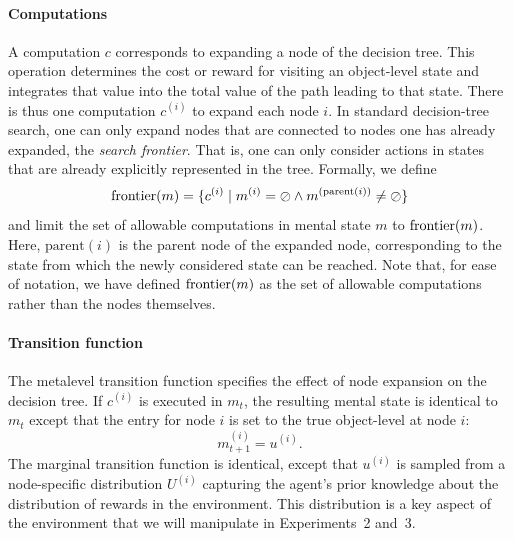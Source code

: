 \paragraph{Computations}

A computation $c$ corresponds to expanding a node of the decision tree. This operation determines the cost or reward for visiting an object-level state and integrates that value into the total value of the path leading to that state. There is thus one computation $c^{(i)}$ to expand each node $i$. In standard decision-tree search, one can only expand nodes that are connected to nodes one has already expanded, the \emph{search frontier}. That is, one can only consider actions in states that are already explicitly represented in the tree. Formally, we define
\begin{equation}
\mathrm{frontier}(m) = \{c^{(i)} \mid m^{(i)} = \oslash \wedge m^{(\mathrm{parent}(i))} \neq \oslash \}
\end{equation}
and limit the set of allowable computations in mental state $m$ to $\mathrm{frontier}(m)$. Here, $\mathrm{parent}(i)$ is the parent node of the expanded node, corresponding to the state from which the newly considered state can be reached. Note that, for ease of notation, we have defined $\mathrm{frontier}(m)$ as the set of allowable computations rather than the nodes themselves.


\paragraph{Transition function}

The metalevel transition function specifies the effect of node expansion on the decision tree. If $c^{(i)}$ is executed in $m_t$, the resulting mental state is identical to $m_t$ except that the entry for node $i$ is set to the true object-level at node $i$:
\begin{equation}
  m_{t+1}^{(i)} = u^{(i)}.
\end{equation}
The marginal transition function is identical, except that $u^{(i)}$ is sampled from a node-specific distribution $U^{(i)}$ capturing the agent's prior knowledge about the distribution of rewards in the environment. This distribution is a key aspect of the environment that we will manipulate in Experiments~2 and~3.

